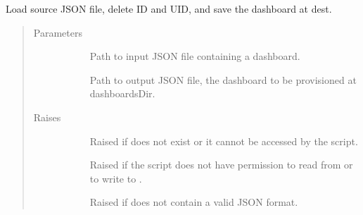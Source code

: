 \documentclass[letterpaper,10pt,english]{sphinxmanual}
\begin{document}
\begin{fulllineitems}
\label{\detokenize{inputs:gpInputs.copyDashboardWithoutIds}}
Load source JSON file, delete ID and UID, and save the dashboard at dest.
\begin{quote}\begin{description}
\item[{Parameters}] \leavevmode\begin{description}
\item[{}] \leavevmode{[}\sphinxtitleref{str}{]}
Path to input JSON file containing a dashboard.

\item[{}] \leavevmode{[}\sphinxtitleref{str}{]}
Path to output JSON file, the dashboard to be provisioned at dashboardsDir.

\end{description}

\item[{Raises}] \leavevmode\begin{description}
\item[{}] \leavevmode
Raised if  does not exist or it cannot be accessed by the script.

\item[{}] \leavevmode
Raised if the script does not have permission to read from  or to
write to .

\item[{}] \leavevmode
Raised if  does not contain a valid JSON format.

\end{description}

\end{description}\end{quote}

\end{fulllineitems}

\end{document}
